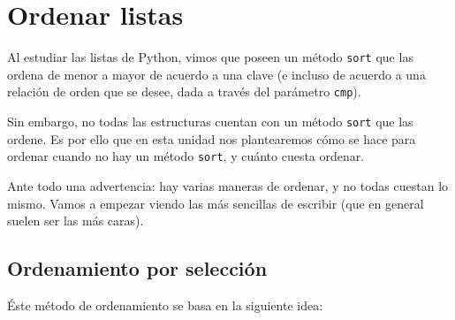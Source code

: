 \chapter{Ordenar listas}

Al estudiar las listas de Python, vimos que poseen un método \lstinline!sort!
que las ordena de menor a mayor de acuerdo a una clave (e incluso de acuerdo a
una relación de orden que se desee, dada a través del parámetro
\lstinline!cmp!).

Sin embargo, no todas las estructuras cuentan con un método
\lstinline!sort! que las ordene.  Es por ello que en esta unidad nos
plantearemos cómo se hace para ordenar cuando no hay un método
\lstinline!sort!, y cuánto cuesta ordenar.

Ante todo una advertencia: hay varias maneras de ordenar, y no todas
cuestan lo mismo. Vamos a empezar viendo las más sencillas de escribir
(que en general suelen ser las más caras).

\section{Ordenamiento por selección}
Éste método de ordenamiento se basa en la siguiente idea:


